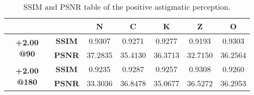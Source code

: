 
\begin{table}[!b]
	\centering
	\label{table:metrics_astig+2}
	\caption[SSIM and PSNR table of the positive astigmatic perception]{SSIM and PSNR table of the positive astigmatic perception.}
	\begin{tabular}{ccccccc}
	\hline
	{\bf }                                                 & {\bf }                          & {\bf N} & {\bf C} & {\bf K} & {\bf Z} & {\bf O} \\ \hline
	\multicolumn{1}{c|}{\multirow{2}{*}{{\bf +2.00 @90}}}  & \multicolumn{1}{c|}{{\bf SSIM}} & 0.9307  & 0.9271  & 0.9277  & 0.9193  & 0.9303  \\
	\multicolumn{1}{c|}{}                                  & \multicolumn{1}{c|}{{\bf PSNR}} & 37.2835 & 35.4130 & 36.3713 & 32.7150 & 36.2564 \\ \hline
	\multicolumn{1}{c|}{\multirow{2}{*}{{\bf +2.00 @180}}} & \multicolumn{1}{c|}{{\bf SSIM}} & 0.9235  & 0.9287  & 0.9257  & 0.9308  & 0.9260  \\
	\multicolumn{1}{c|}{}                                  & \multicolumn{1}{c|}{{\bf PSNR}} & 33.3036 & 36.8478 & 35.0677 & 36.5272 & 36.2953 \\ \hline
	\end{tabular}

\end{table}